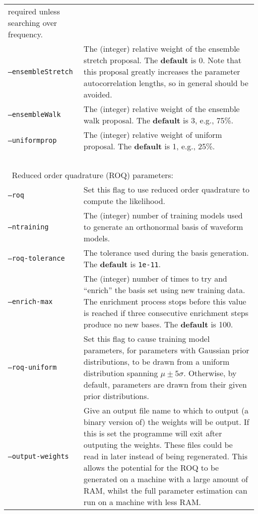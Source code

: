 \begin{footnotesize}
\begin{longtable}{|p{}p{}|}
                            required unless searching over frequency. \\
 {\tt --ensembleStretch} &  The (integer) relative weight of the ensemble stretch proposal. The {\bf default} is 0. Note that this
                            proposal greatly increases the parameter autocorrelation lengths, so in general should be avoided. \\
 {\tt --ensembleWalk}    &  The (integer) relative weight of the ensemble walk proposal. The {\bf default} is 3, e.g., 75\%. \\
 {\tt --uniformprop}     &  The (integer) relative weight of uniform proposal. The {\bf default} is 1, e.g., 25\%. \\
 ~ & ~ \\
\multicolumn{2}{|l|}{~Reduced order quadrature (ROQ) parameters:} \\
 {\tt --roq}             &  Set this flag to use reduced order quadrature to compute the likelihood. \\
 {\tt --ntraining}       &  The (integer) number of training models used to generate an orthonormal basis of waveform models. \\
 {\tt --roq-tolerance}   &  The tolerance used during the basis generation. The {\bf default} is {\tt 1e-11}. \\
 {\tt --enrich-max}      &  The (integer) number of times to try and ``enrich'' \citep[see, e.g.,][]{2016PhRvD..94d4031S} the basis set using new training
                            data. The enrichment process stops before this value is reached if three consecutive enrichment steps
                            produce no new bases. The {\bf default} is 100. \\ 
 {\tt --roq-uniform}     &  Set this flag to cause training model parameters, for parameters with Gaussian prior distributions, to be drawn from a
                            uniform distribution spanning $\mu \pm 5 \sigma$. Otherwise, by
                            default, parameters are drawn from their given prior distributions. \\
 {\tt --output-weights}  &  Give an output file name to which to output (a binary version of) the weights will be output. If this is set the
                            programme will exit after outputing the weights. These files could be read in later instead of being regenerated.
                            This allows the potential for the ROQ to be generated on a machine with a large amount of RAM, whilst the full parameter
                            estimation can run on a machine with less RAM. \\

\end{longtable}
\end{footnotesize}
